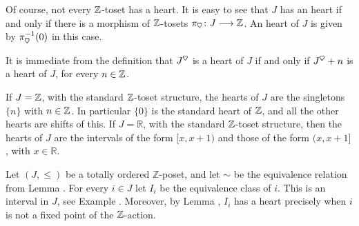 \begin{remark}\label{hasaheart}
Of course, not every $\mathbb{Z}$-toset has a heart. It is easy to see that $J$ has an heart if and only if there is a morphism of $\mathbb{Z}$-tosets $\pi_\heart\colon J \to \Z$. An heart of $J$ is given by $\pi_\heart^{-1}(0)$ in this case.
\end{remark}
\begin{remark}
It is immediate from the definition that $J^\heart$ is a heart of $J$ if and only if $J^\heart+n$ is a heart of $J$, for every $n\in \mathbb{Z}$.
\end{remark}
\begin{example}
If $J=\mathbb{Z}$, with the standard $\mathbb{Z}$-toset structure, the hearts of $J$ are the singletons $\{n\}$ with $n\in \mathbb{Z}$. In particular $\{0\}$ is the standard heart of $\mathbb{Z}$, and all the other hearts are shifts of this. If $J=\mathbb{R}$, with the standard $\mathbb{Z}$-toset structure, then the hearts of $J$ are the intervals of the form $[x,x+1)$ and those of the form $(x,x+1]$, with $x\in \mathbb{R}$.
\end{example}

\begin{example}\label{I.has.a.heart}
Let $(J, \leq)$ be a totally ordered $\mathbb{Z}$-poset, and let $\sim$ be the equivalence relation from Lemma . For every $i\in J$ let $I_i$ be the equivalence class of $i$. This is an interval in $J$, see Example . Moreover, by Lemma , $I_i$ has a heart precisely when $i$ is not a fixed point of the $\mathbb{Z}$-action.
\end{example}

